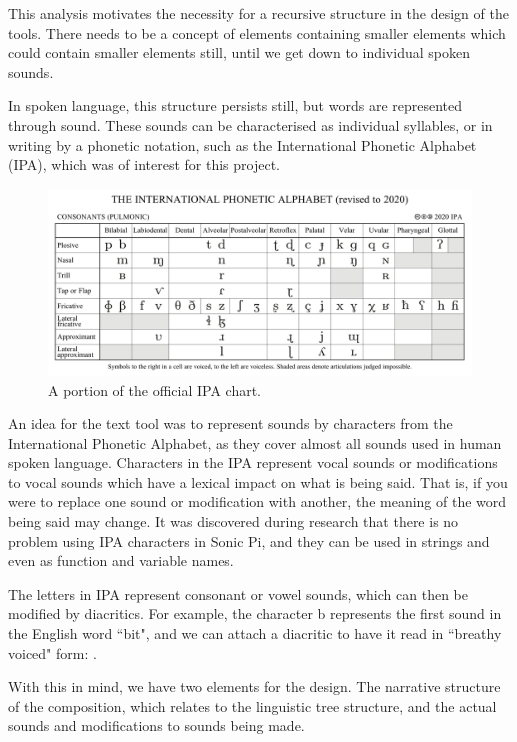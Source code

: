 \documentclass[12pt,a4paper,twoside,openright]{report}
\begin{document}
This analysis motivates the necessity for a recursive structure in the design of the tools. There needs to be a concept of elements containing smaller elements which could contain smaller elements still, until we get down to individual spoken sounds.

In spoken language, this structure persists still, but words are represented through sound. These sounds can be characterised as individual syllables, or in writing by a phonetic notation, such as the International Phonetic Alphabet (IPA), which was of interest for this project.
\begin{figure}[h]
    \centering
    \includegraphics[scale=0.3]{images/IPA.png}
    \caption{A portion of the official IPA chart.\protect\footnotemark}
    \label{fig:ipa_chart}
\end{figure}

An idea for the text tool was to represent sounds by characters from the International Phonetic Alphabet, as they cover almost all sounds used in human spoken language. Characters in the IPA represent vocal sounds or modifications to vocal sounds which have a lexical impact on what is being said. That is, if you were to replace one sound or modification with another, the meaning of the word being said may change. It was discovered during research that there is no problem using IPA characters in Sonic Pi, and they can be used in strings and even as function and variable names.

The letters in IPA represent consonant or vowel sounds, which can then be modified by diacritics. For example, the character b represents the first sound in the English word ``bit", and we can attach a diacritic to have it read in ``breathy voiced" form: .

With this in mind, we have two elements for the design. The narrative structure of the composition, which relates to the linguistic tree structure, and the actual sounds and modifications to sounds being made.
\end{document}

